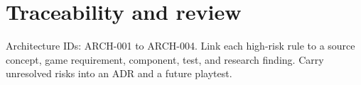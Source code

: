 \documentclass[11pt]{article}
\begin{document}
\section{Traceability and review}
Architecture IDs: ARCH-001 to ARCH-004. Link each high-risk rule to a source concept, game requirement, component, test, and research finding. Carry unresolved risks into an ADR and a future playtest.
\end{document}

